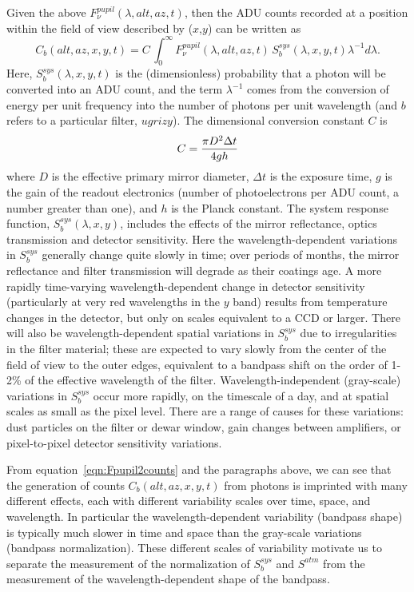 \documentclass[12pt,preprint]{aastex}
\begin{document}
Given the above $F_\nu^{pupil}(\lambda,alt,az,t)$, then the ADU counts
recorded at a position within the field of view described by ($x$,$y$)
can be written as
\begin{equation}
\label{eqn:Fpupil2counts}
    C_b(alt,az,x,y,t) = C \, \int_0^\infty {F_\nu^{pupil}(\lambda,alt,az,t) \, S_b^{sys}(\lambda,x,y,t) \lambda^{-1}d\lambda}.
\end{equation}
Here, $S_b^{sys}(\lambda,x,y,t)$ is the (dimensionless) probability
that a photon will be converted into an ADU count, and the term
$\lambda^{-1}$ comes from the conversion of energy per unit frequency
into the number of photons per unit wavelength (and $b$ refers to a particular filter, $ugrizy$). The
dimensional conversion constant $C$ is
\begin{equation}
\label{eqn:Cconstant}
        C = {\pi D^2 \Delta t \over 4 g h }  
\end{equation}
where $D$ is the effective primary mirror diameter, $\Delta t$ is the
exposure time, $g$ is the gain of the readout electronics (number of
photoelectrons per ADU count, a number greater than one), and $h$ is
the Planck constant. The system response function,
$S_b^{sys}(\lambda,x,y)$, includes the effects of the mirror
reflectance, optics transmission and detector sensitivity. Here the
wavelength-dependent variations in $S_b^{sys}$ generally change quite
slowly in time; over periods of months, the mirror reflectance and
filter transmission will degrade as their coatings age. A more rapidly
time-varying wavelength-dependent change in detector sensitivity
(particularly at very red wavelengths in the $y$ band) results from
temperature changes in the detector, but only on scales equivalent to
a CCD or larger.  There will also be wavelength-dependent spatial
variations in $S_b^{sys}$ due to irregularities in the filter
material; these are expected to vary slowly from the center of the
field of view to the outer edges, equivalent to a bandpass shift on
the order of 1-2\% of the effective wavelength of the
filter. Wavelength-independent (gray-scale) variations in $S_b^{sys}$
occur more rapidly, on the timescale of a day, and at spatial scales
as small as the pixel level. There are a range of causes for these
variations: dust particles on the filter or dewar window, gain changes
between amplifiers, or pixel-to-pixel detector sensitivity variations.

From equation~\ref{eqn:Fpupil2counts} and the paragraphs above, we can
see that the generation of counts $C_b(alt,az,x,y,t)$ from photons is
imprinted with many different effects, each with different variability
scales over time, space, and wavelength. In particular the
wavelength-dependent variability (bandpass shape) is
typically much slower in time and space than the gray-scale variations
(bandpass normalization). These different scales of variability
motivate us to separate the measurement of the normalization of
$S_b^{sys}$ and $S^{atm}$ from the measurement of the
wavelength-dependent shape of the bandpass.
\end{document}
